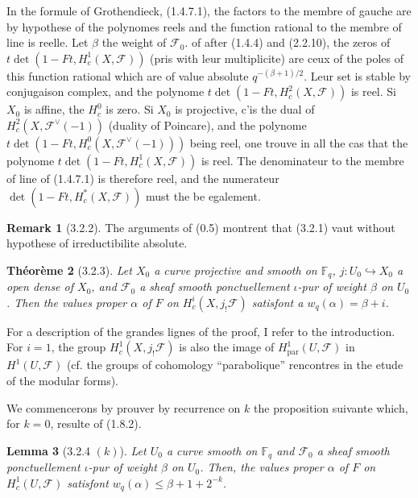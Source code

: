 \documentclass[12pt,a4paper]{article}
\theoremstyle{plain}
\newtheorem{theorem}{Th\'eor\`eme}[section]
\newtheorem{lemma}[theorem]{Lemma}
\theoremstyle{definition}
\newtheorem{remark}[theorem]{Remark}
\theoremstyle{remark}
\newcommand{\FF}{{\mathbb{F}}}
\begin{document}
In the formule of Grothendieck, (1.4.7.1), the factors to the membre of gauche are by hypothese of the polynomes reels and the function rational to the membre of line is reelle. Let $\beta$ the weight of $\mathscr{F}_0$. of after (1.4.4) and (2.2.10), the zeros of $t \det(1 - Ft, H_c^1(X, \mathscr{F}))$ (pris with leur multiplicite) are ceux of the poles of this function rational which are of value absolute $q^{-(\beta+1)/2}$. Leur set is stable by conjugaison complex, and the polynome $t \det(1 - Ft, H_c^2(X, \mathscr{F}))$ is reel. Si $X_0$ is affine, the $H_c^0$ is zero. Si $X_0$ is projective, c'is the dual of $H_c^2(X, \mathscr{F}^\vee(-1))$ (duality of Poincare), and the polynome $t \det(1 - Ft, H_c^0(X, \mathscr{F}^\vee(-1)))$ being reel, one trouve in all the cas that the polynome $t \det(1 - Ft, H_c^1(X, \mathscr{F}))$ is reel. The denominateur to the membre of line of (1.4.7.1) is therefore reel, and the numerateur $\det(1 - Ft, H_c^*(X, \mathscr{F}))$ must the be egalement.

\begin{remark}[3.2.2]
The arguments of (0.5) montrent that (3.2.1) vaut without hypothese of irreductibilite absolute.
\end{remark}

\begin{theorem}[3.2.3]
Let $X_0$ a curve projective and smooth on $\FF_q$, $j : U_0 \hookrightarrow X_0$ a open dense of $X_0$, and $\mathscr{F}_0$ a sheaf smooth ponctuellement $\iota$-pur of weight $\beta$ on $U_0$. Then the values proper $\alpha$ of $F$ on $H_c^i(X, j_!\mathscr{F})$ satisfont a $w_q(\alpha) = \beta + i$.
\end{theorem}

For a description of the grandes lignes of the proof, I refer to the introduction. For $i = 1$, the group $H_c^1(X, j_!\mathscr{F})$ is also the image of $H_{\text{par}}^1(U, \mathscr{F})$ in $H^1(U, \mathscr{F})$ (cf. the groups of cohomology ``parabolique'' rencontres in the etude of the modular forms).

We commencerons by prouver by recurrence on $k$ the proposition suivante which, for $k = 0$, resulte of (1.8.2).

\begin{lemma}[3.2.4 $(k)$]
Let $U_0$ a curve smooth on $\FF_q$ and $\mathscr{F}_0$ a sheaf smooth ponctuellement $\iota$-pur of weight $\beta$ on $U_0$. Then, the values proper $\alpha$ of $F$ on $H_c^1(U, \mathscr{F})$ satisfont $w_q(\alpha) \leq \beta + 1 + 2^{-k}$.
\end{lemma}
\end{document}
